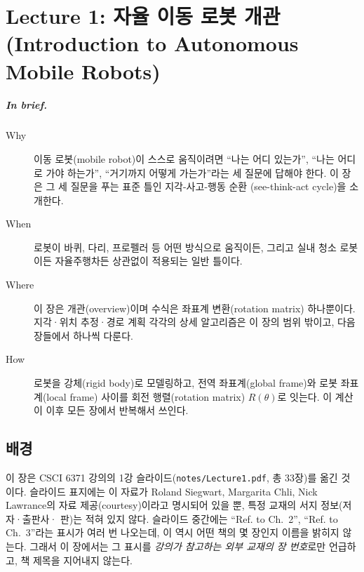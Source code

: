 \chapter{Lecture 1: 자율 이동 로봇 개관 (Introduction to Autonomous Mobile Robots)}
\label{ch:lec01}


\paragraph{In brief.}
\begin{description}
  \item[Why] 이동 로봇(mobile robot)이 스스로 움직이려면 ``나는 어디 있는가'',
    ``나는 어디로 가야 하는가'', ``거기까지 어떻게 가는가''라는 세 질문에 답해야
    한다. 이 장은 그 세 질문을 푸는 표준 틀인 지각-사고-행동 순환
    (see-think-act cycle)을 소개한다.
  \item[When] 로봇이 바퀴, 다리, 프로펠러 등 어떤 방식으로 움직이든, 그리고 실내
    청소 로봇이든 자율주행차든 상관없이 적용되는 일반 틀이다.
  \item[Where] 이 장은 개관(overview)이며 수식은 좌표계 변환(rotation matrix)
    하나뿐이다. 지각·위치 추정·경로 계획 각각의 상세 알고리즘은 이 장의 범위
    밖이고, 다음 장들에서 하나씩 다룬다.
  \item[How] 로봇을 강체(rigid body)로 모델링하고, 전역 좌표계(global frame)와
    로봇 좌표계(local frame) 사이를 회전 행렬(rotation matrix) $R(\theta)$로
    잇는다. 이 계산이 이후 모든 장에서 반복해서 쓰인다.
\end{description}

\section{배경}
\label{sec:lec01-bg}

이 장은 CSCI 6371 강의의 1강 슬라이드(\texttt{notes/Lecture1.pdf}, 총 33장)를
옮긴 것이다. %
슬라이드 표지에는 이 자료가 Roland Siegwart, Margarita Chli, Nick Lawrance의
자료 제공(courtesy)이라고 명시되어 있을 뿐, 특정 교재의 서지 정보(저자·출판사·
판)는 적혀 있지 않다. %
슬라이드 중간에는 ``Ref. to Ch.\ 2'', ``Ref. to Ch.\ 3''라는 표시가 여러 번
나오는데, 이 역시 어떤 책의 몇 장인지 이름을 밝히지 않는다. 그래서 이 장에서는
그 표시를 \emph{강의가 참고하는 외부 교재의 장 번호}로만 언급하고, 책 제목을
지어내지 않는다. %

